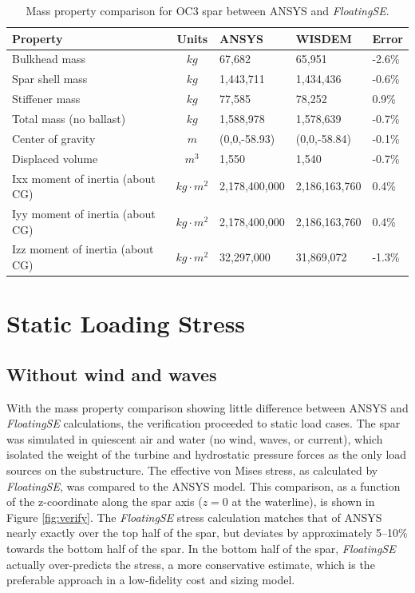 \begin{table}[htbp] \begin{center}
    \caption{Mass property comparison for OC3 spar between ANSYS and \textit{FloatingSE}.}
    \label{tbl:verify}
{\small
  \begin{tabular}{ l c l l l } \hline
    \textbf{Property} & \textbf{Units} & \textbf{ANSYS} & \textbf{WISDEM} & \textbf{Error}\\
    \hline \hline
    Bulkhead mass & $kg$ & 67,682 & 65,951 & -2.6\% \\
    Spar shell mass & $kg$ & 1,443,711 & 1,434,436 & -0.6\%\\
    Stiffener mass  & $kg$ & 77,585 & 78,252 & 0.9\% \\
    Total mass (no ballast) & $kg$ & 1,588,978 & 1,578,639 & -0.7\%\\
    Center of gravity & $m$ & (0,0,-58.93) & (0,0,-58.84) & -0.1\%\\
    Displaced volume & $m^3$ & 1,550 &1,540 & -0.7\% \\
    Ixx moment of inertia (about CG) & $kg\cdot m^2$ & 2,178,400,000 &2,186,163,760 & 0.4\%\\
    Iyy moment of inertia (about CG) & $kg\cdot m^2$ & 2,178,400,000 &2,186,163,760 & 0.4\%\\
    Izz moment of inertia (about CG) & $kg\cdot m^2$ & 32,297,000 & 31,869,072 & -1.3\%\\
  \hline \end{tabular}
}
\end{center} \end{table}

\section{Static Loading Stress}
\subsection{Without wind and waves}
With the mass property comparison showing little difference between
ANSYS and \textit{FloatingSE} calculations, the verification proceeded
to static load cases.  The spar was simulated in quiescent air and water
(no wind, waves, or current), which isolated the weight of the turbine
and hydrostatic pressure forces as the only load sources on the
substructure.  The effective von Mises stress, as calculated by
\textit{FloatingSE}, was compared to the ANSYS model.  This comparison,
as a function of the z-coordinate along the spar axis ($z=0$ at the
waterline), is shown in Figure \ref{fig:verify}.  The
\textit{FloatingSE} stress calculation matches that of ANSYS nearly
exactly over the top half of the spar, but deviates by approximately
5--10\% towards the bottom half of the spar.  In the bottom half of the
spar, \textit{FloatingSE} actually over-predicts the stress, a more
conservative estimate, which is the preferable approach in a
low-fidelity cost and sizing model.

